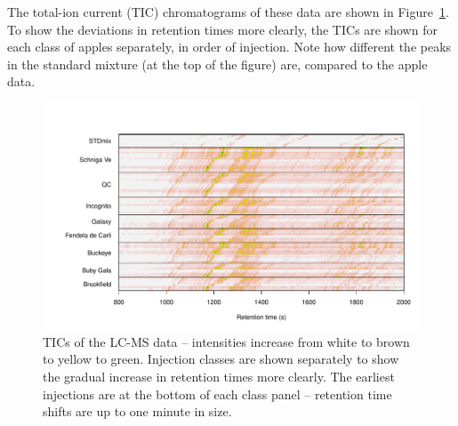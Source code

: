 \documentclass[a4paper,11pt]{article}
\begin{document}
The total-ion current (TIC)
chromatograms of these data are shown in Figure~\ref{fig:tics}. To
show the deviations in retention times more clearly, the TICs are
shown for each class of apples separately, in order of injection. Note
how different the peaks in the standard mixture (at the top of the
figure) are, compared to the apple data.
\begin{figure}[Htb]
\centering
{}
\includegraphics{stickPTW-013}
\caption{TICs of the LC-MS data -- intensities increase from white to
  brown to yellow to green. Injection
  classes are shown separately to show the gradual increase in
  retention times more clearly. The earliest injections are at the
  bottom of each class panel -- retention time shifts are up to one
  minute in size.}
\label{fig:tics}
\end{figure}
\end{document}
